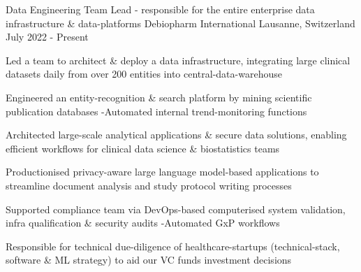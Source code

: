 

\begin{cventries}

\vspace{-0.3cm}
 \cventry
    {Data Engineering Team Lead - responsible for the entire enterprise data infrastructure \& data-platforms} %
    {Debiopharm International} %
    {Lausanne, Switzerland} %
    {July 2022 - Present} %
    {
      \begin{cvitems} %
      	\item {Led a team to architect \& deploy a data infrastructure, integrating large clinical datasets daily from over 200 entities into central-data-warehouse}
        \item {Engineered an entity-recognition \& search platform by mining scientific publication databases -Automated internal trend-monitoring functions}
        \item {Architected large-scale analytical applications \& secure data solutions, enabling efficient workflows for clinical data science \& biostatistics teams}
        \item {Productionised privacy-aware large language model-based applications to streamline document analysis and study protocol writing processes}
        \item {Supported compliance team via DevOps-based computerised system validation, infra qualification \& security audits -Automated GxP workflows}
        \item {Responsible for technical due-diligence of healthcare-startups (technical-stack, software \& ML strategy) to aid our VC funds investment decisions}
      \end{cvitems}
    }
	\vspace{-0.1cm}
	

\end{cventries}
